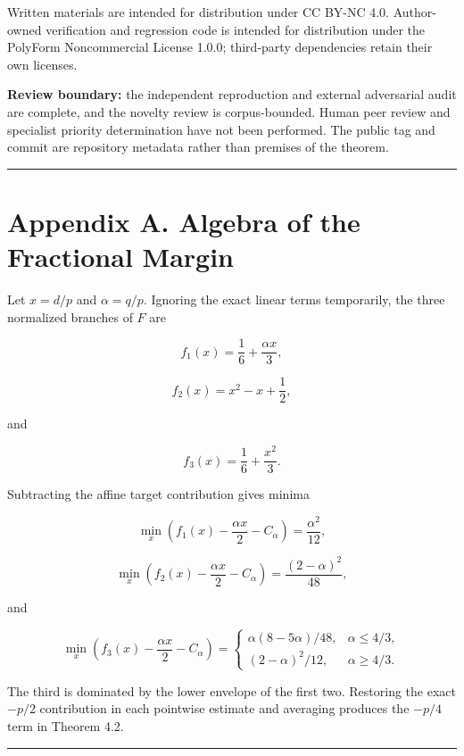 \documentclass[
  american,
  11pt,
  a4paper,
]{article}
\begin{document}
Written materials are intended for distribution under CC BY-NC 4.0. Author-owned verification and regression code is intended for distribution under the PolyForm Noncommercial License 1.0.0; third-party dependencies retain their own licenses.

\textbf{Review boundary:} the independent reproduction and external adversarial audit are complete, and the novelty review is corpus-bounded. Human peer review and specialist priority determination have not been performed. The public tag and commit are repository metadata rather than premises of the theorem.

\begin{center}\rule{0.5\linewidth}{0.5pt}\end{center}

\section{Appendix A. Algebra of the Fractional Margin}\label{appendix-a.-algebra-of-the-fractional-margin}

Let \(x=d/p\) and \(\alpha=q/p\). Ignoring the exact linear terms temporarily, the three normalized branches of \(F\) are

\[
f_1(x)=\frac16+\frac{\alpha x}{3},
\]

\[
f_2(x)=x^2-x+\frac12,
\]

and

\[
f_3(x)=\frac16+\frac{x^2}{3}.
\]

Subtracting the affine target contribution gives minima

\[
\min_x\left(f_1(x)-\frac{\alpha x}{2}-C_\alpha\right)
=
\frac{\alpha^2}{12},
\]

\[
\min_x\left(f_2(x)-\frac{\alpha x}{2}-C_\alpha\right)
=
\frac{(2-\alpha)^2}{48},
\]

and

\[
\min_x\left(f_3(x)-\frac{\alpha x}{2}-C_\alpha\right)
=
\begin{cases}
\alpha(8-5\alpha)/48,&\alpha\le4/3,\\
(2-\alpha)^2/12,&\alpha\ge4/3.
\end{cases}
\]

The third is dominated by the lower envelope of the first two. Restoring the exact \(-p/2\) contribution in each pointwise estimate and averaging produces the \(-p/4\) term in Theorem 4.2.

\begin{center}\rule{0.5\linewidth}{0.5pt}\end{center}
\end{document}
